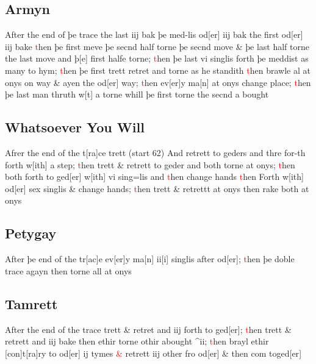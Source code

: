 \documentclass[12pt,letter]{article} %
\newcommand{\red}[1]{\textcolor{red}{#1}}
\newcommand{\srcpg}[1]{(start #1)}
\begin{document}
\subsection{Armyn}
After the end of þe trace the last iij bak þe med-lis od{[}er{]} iij bak
the first od{[}er{]} iij bake \red{t}hen þe first meve þe secnd half torne þe
secnd move \& þe last half torne the last move and þ{[}e{]} first halfe
torne; \red{t}hen þe last vi singlis forth þe meddist as many to hym; \red{t}hen þe
first trett retret and torne as he standith \red{t}hen brawle al at onys on
way \& ayen the od{[}er{]} way; \red{t}hen ev{[}er{]}y ma{[}n{]} at onys change
place; \red{t}hen þe last man thruth w{[}t{]} a torne whill þe first torne the
secnd a bought

\subsection{Whatsoever You Will}
Afrer the end of the t{[}ra{]}ce trett \srcpg{62} And retrett to geders
and thre for-th forth w{[}ith{]} a step; \red{t}hen trett \& retrett to geder
and both torne at onys; \red{t}hen both forth to ged{[}er{]} w{[}ith{]} vi
sing=lis and \red{t}hen change hands \red{t}hen Forth w{[}ith{]} od{[}er{]} sex
singlis \& change hands; \red{t}hen trett \& retrettt at onys then rake both
at onys

\subsection{Petygay}
After þe end of the tr{[}ac{]}e ev{[}er{]}y ma{[}n{]} ii{[}i{]} singlis
after od{[}er{]}; \red{t}hen þe doble trace agayn then torne all at onys

\subsection{Tamrett}
After the end of the trace trett \& retret and iij forth to ged{[}er{]};
\red{t}hen trett \& retrett and iij bake then ethir torne othir abought
\^{}ii; \red{t}hen brayl ethir {[}con{]}t{[}ra{]}ry to od{[}er{]} ij tymes \red{\&}
retrett iij other fro od{[}er{]} \& then com toged{[}er{]}
\end{document}
